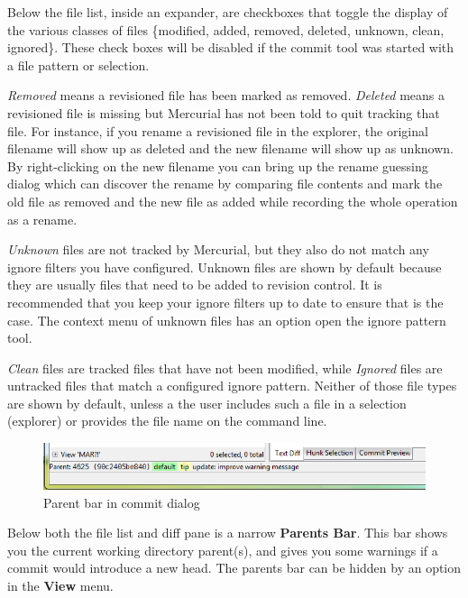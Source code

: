 \documentclass[letterpaper,10pt,english]{manual}
\begin{document}
Below the file list, inside an expander, are checkboxes that toggle the
display of the various classes of files \{modified, added, removed,
deleted, unknown, clean, ignored\}.  These check boxes will be disabled
if the commit tool was started with a file pattern or selection.

\emph{Removed} means a revisioned file has been marked as removed. \emph{Deleted}
means a revisioned file is missing but Mercurial has not been told to
quit tracking that file. For instance, if you rename a revisioned file
in the explorer, the original filename will show up as deleted and the
new filename will show up as unknown. By right-clicking on the new
filename you can bring up the rename guessing dialog which can discover
the rename by comparing file contents and mark the old file as removed
and the new file as added while recording the whole operation as a
rename.

\emph{Unknown} files are not tracked by Mercurial, but they also do not match
any ignore filters you have configured.  Unknown files are shown by
default because they are usually files that need to be added to revision
control.  It is recommended that you keep your ignore filters up to date
to ensure that is the case.  The context menu of unknown files has an
option open the ignore pattern tool.

\emph{Clean} files are tracked files that have not been modified, while
\emph{Ignored} files are untracked files that match a configured ignore
pattern.  Neither of those file types are shown by default, unless a the
user includes such a file in a selection (explorer) or provides the file
name on the command line.
\begin{figure}[htbp]
\centering

\includegraphics{parentbar.png}
\caption{Parent bar in commit dialog}\end{figure}

Below both the file list and diff pane is a narrow
\textbf{Parents Bar}.  This bar shows you the current working
directory parent(s), and gives you some warnings if a commit would
introduce a new head.  The parents bar can be hidden by an option in the
\textbf{View} menu.
\end{document}
